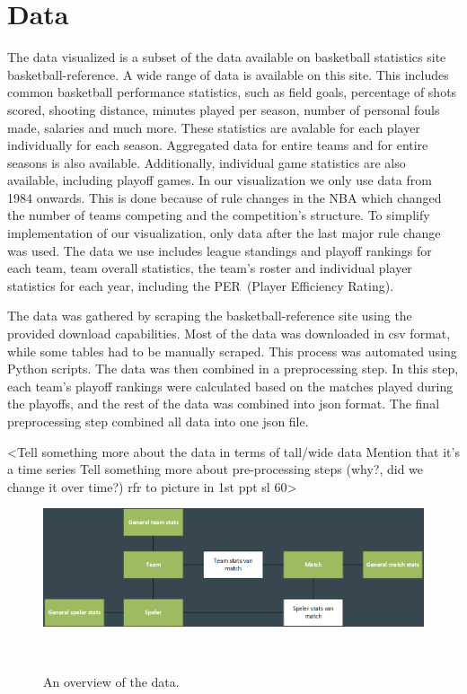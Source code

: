 \documentclass{sigchi}
\begin{document}
\section{Data}\label{sec:data}
The data visualized is a subset of the data available on basketball statistics
site basketball-reference\cite{basketball-reference}. A wide range of data is
available on this site. This includes common basketball performance statistics,
such as field goals, percentage of shots scored, shooting distance, minutes
played per season, number of personal fouls made, salaries and much more. These
statistics are avalable for each player individually for each season. Aggregated
data for entire teams and for entire seasons is also available. Additionally,
individual game statistics are also available, including playoff games.  In our
visualization we only use data from 1984 onwards. This is done because of rule
changes in the NBA which changed the number of teams competing and the
competition's structure. To simplify implementation of our visualization, only
data after the last major rule change was used.  The data we use includes league
standings and playoff rankings for each team, team overall statistics, the
team's roster and individual player statistics for each year, including the
PER~(Player Efficiency Rating)\cite{per}. 

The data was gathered by scraping the basketball-reference site using the
provided download capabilities. Most of the data was downloaded in csv format,
while some tables had to be manually scraped. This process was automated using
Python scripts. The data was then combined in a preprocessing step. In this
step, each team's playoff rankings were calculated based on the matches played
during the playoffs, and the rest of the data was combined into json format. The
final preprocessing step combined all data into one json file.

<Tell something more about the data in terms of tall/wide data
Mention that it's a time series
Tell something more about pre-processing steps (why?, did we change it over time?)
rfr to picture in 1st ppt sl 60>

\begin{figure}
\centering
  \includegraphics[width=0.9\columnwidth]{figures/data}
  \caption{An overview of the data.}~\label{fig:data}
\end{figure}
\end{document}
